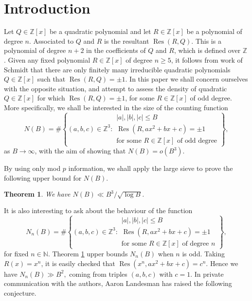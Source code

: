 \documentclass[JEP,XML,SOM,Unicode]{cedram}
\DeclareMathOperator{\Res}{Res}
\newcommand{\NN}{\mathbb{N}}
\newcommand{\ZZ}{\mathbb{Z}}\let\Z\ZZ
\newtheorem{theorem}{Theorem}[section]
\begin{document}
\maketitle
\vspace*{-4pt}
\tableofcontents
\mainmatter

\section{Introduction}

Let $Q\in \ZZ[x]$ be a quadratic polynomial
and let $R\in \ZZ[x]$ be a polynomial of degree $n$.
Associated to $Q$ and $R$ is the
resultant $\Res(R,Q)$. This is a polynomial of degree $n+2$ in the coefficients of $Q$ and $R$, which is defined over $\ZZ$.
Given any fixed polynomial $R\in \ZZ[x]$ of degree $n\geq 5$, it follows from work of Schmidt \cite[Th.\,1]{Schmidt} that there are only finitely many irreducible quadratic polynomials $Q\in \ZZ[x]$ such that $\Res(R,Q)=\pm 1$.
In this paper we shall concern ourselves with the
opposite situation, and attempt to assess the
density of quadratic $Q\in \ZZ[x]$
for which
$\Res(R,Q)=\pm 1$, for some $R\in \ZZ[x]$ of odd degree.
More specifically, we shall be interested in the size of the counting function
\begin{equation}\label{eq:NB'}
N(B)=\#\left\{(a,b,c)\in \ZZ^3:
\begin{array}{l}
|a|,|b|,|c|\leq B\\
\Res(R,ax^2+bx+c)=\pm 1\\
\text{for some $R\in \ZZ[x]$ of odd degree}
\end{array}
\right\}\!,
\end{equation}
as $B\to \infty$, with the aim of showing that $N(B)=o(B^3)$.

By using only mod $p$ information, we shall apply the large sieve to prove the following upper bound for $N(B)$.

\begin{theorem}\label{t:1}
We have
$
N(B)\ll B^3/\sqrt{\log B}$.
\end{theorem}

It is also interesting to ask about the behaviour of the function
\begin{equation}\label{eq:NB}
N_n(B)=\#\left\{(a,b,c)\in \ZZ^3:
\begin{array}{l}
|a|,|b|,|c|\leq B\\
\Res(R,ax^2+bx+c)=\pm 1\\
\text{for some $R\in \ZZ[x]$ of degree $n$}
\end{array}
\right\}\!,
\end{equation}
for fixed $n\in \NN$.
Theorem \ref{t:1} upper bounds $N_n(B)$ when $n$ is odd.
Taking $R(x)=x^n$, it is easily checked that
$\Res(x^n,ax^2+bx+c)=c^n$. Hence we have
$
N_n(B)\gg B^2,
$
coming from triples $(a,b,c)$ with $c=1$.
In private communication with the authors, Aaron Landesman has raised the following conjecture.
\end{document}
